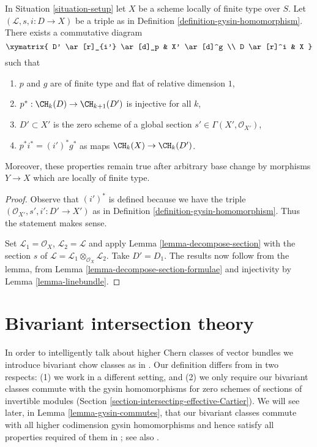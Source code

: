 \begin{lemma}
\label{lemma-normal-cone-effective-Cartier}
In Situation \ref{situation-setup} let $X$ be a scheme locally
of finite type over $S$. Let $(\mathcal{L}, s, i : D \to X)$
be a triple as in Definition \ref{definition-gysin-homomorphism}.
There exists a commutative diagram
$$
\xymatrix{
D' \ar[r]_{i'} \ar[d]_p & X' \ar[d]^g \\
D \ar[r]^i & X
}
$$
such that
\begin{enumerate}
\item $p$ and $g$ are of finite type and flat of relative dimension $1$,
\item $p^* : \CH_k(D) \to \CH_{k + 1}(D')$ is injective for all $k$,
\item $D' \subset X'$ is the zero scheme of a global section
$s' \in \Gamma(X', \mathcal{O}_{X'})$,
\item $p^*i^* = (i')^*g^*$ as maps $\CH_k(X) \to \CH_k(D')$.
\end{enumerate}
Moreover, these properties remain true after arbitrary base change
by morphisms $Y \to X$ which are locally of finite type.
\end{lemma}

\begin{proof}
Observe that $(i')^*$ is defined because we have the triple
$(\mathcal{O}_{X'}, s', i' : D' \to X')$ as in
Definition \ref{definition-gysin-homomorphism}. Thus the statement makes sense.

\medskip\noindent
Set $\mathcal{L}_1 = \mathcal{O}_X$, $\mathcal{L}_2 = \mathcal{L}$
and apply Lemma \ref{lemma-decompose-section} with the section $s$ of
$\mathcal{L} = \mathcal{L}_1 \otimes_{\mathcal{O}_X} \mathcal{L}_2$.
Take $D' = D_1$. The results now follow from the lemma, from
Lemma \ref{lemma-decompose-section-formulae}
and injectivity by
Lemma \ref{lemma-linebundle}.
\end{proof}











\section{Bivariant intersection theory}
\label{section-bivariant}

\noindent
In order to intelligently talk about higher Chern classes of vector
bundles we introduce bivariant chow classes as in \cite{F}.
Our definition differs from \cite{F} in two respects:
(1) we work in a different setting, and (2) we only require
our bivariant classes commute with the gysin homomorphisms for
zero schemes of sections of invertible modules
(Section \ref{section-intersecting-effective-Cartier}).
We will see later, in Lemma \ref{lemma-gysin-commutes}, that our
bivariant classes commute with all higher codimension gysin homomorphisms
and hence satisfy all properties required of them in \cite{F}; see
also \cite[Theorem 17.1]{F}.

